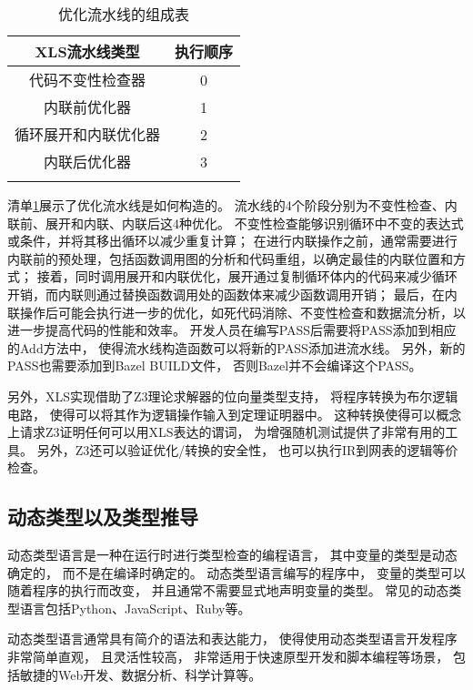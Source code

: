\begin{table}[ht]
\begin{center}
\caption{优化流水线的组成表}

\begin{tabular}{ c c }
    \Xhline{3\arrayrulewidth}
    XLS流水线类型   & 执行顺序 \\
    \hline
    代码不变性检查器   & 0    \\
    内联前优化器     & 1    \\
    循环展开和内联优化器 & 2    \\
    内联后优化器     & 3   \\
    \Xhline{3\arrayrulewidth}
\end{tabular}

\label{table.1}
\end{center}
\end{table}

清单\ref{table.1}展示了优化流水线是如何构造的。
流水线的4个阶段分别为不变性检查、内联前、展开和内联、内联后这4种优化。
不变性检查能够识别循环中不变的表达式或条件，并将其移出循环以减少重复计算；
在进行内联操作之前，通常需要进行内联前的预处理，包括函数调用图的分析和代码重组，以确定最佳的内联位置和方式；
接着，同时调用展开和内联优化，展开通过复制循环体内的代码来减少循环开销，而内联则通过替换函数调用处的函数体来减少函数调用开销；
最后，在内联操作后可能会执行进一步的优化，如死代码消除、不变性检查和数据流分析，以进一步提高代码的性能和效率。
开发人员在编写PASS后需要将PASS添加到相应的Add方法中，
使得流水线构造函数可以将新的PASS添加进流水线。
另外，新的PASS也需要添加到Bazel BUILD文件，
否则Bazel并不会编译这个PASS。

另外，XLS实现借助了Z3理论求解器\cite{z3}的位向量类型支持，
将程序转换为布尔逻辑电路，
使得可以将其作为逻辑操作输入到定理证明器中。
这种转换使得可以概念上请求Z3证明任何可以用XLS表达的谓词，
为增强随机测试提供了非常有用的工具。
另外，Z3还可以验证优化/转换的安全性，
也可以执行IR到网表的逻辑等价检查。

\subsection{动态类型以及类型推导}

动态类型语言是一种在运行时进行类型检查的编程语言，
其中变量的类型是动态确定的，
而不是在编译时确定的。
动态类型语言编写的程序中，
变量的类型可以随着程序的执行而改变，
并且通常不需要显式地声明变量的类型。
常见的动态类型语言包括Python、JavaScript、Ruby等。

动态类型语言通常具有简介的语法和表达能力，
使得使用动态类型语言开发程序非常简单直观，
且灵活性较高，
非常适用于快速原型开发和脚本编程等场景，
包括敏捷的Web开发、数据分析、科学计算等。

